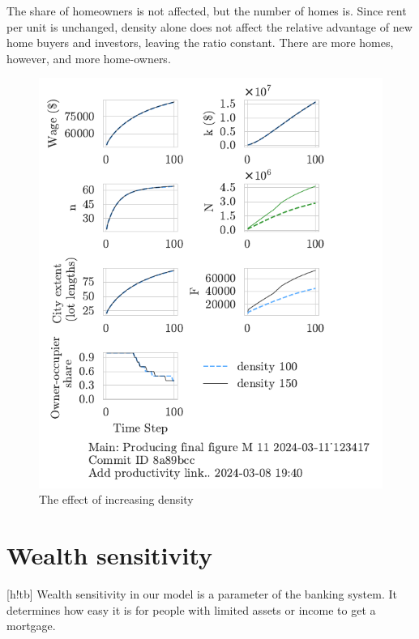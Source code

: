 The share of homeowners is not affected, but the number of homes is. Since rent per unit is unchanged, density alone does not affect the relative advantage of new home buyers and investors, leaving the ratio constant. There are more homes, however, and more home-owners. 

\begin{figure}
    \centering
    \includegraphics[scale=.8, trim={0 1.4cm 0 0},clip]{fig/density-Main-123417.pdf}
    \caption{The effect of increasing density}
    \label{fig:density_ownership_trajectory}
\end{figure}


\newpage



\section{Wealth sensitivity}[h!tb]
Wealth sensitivity in our model is a parameter of the banking system. It determines how easy it is for people with limited assets or income to get a mortgage.

